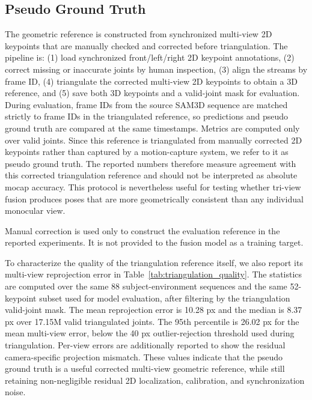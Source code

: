 \documentclass[runningheads]{llncs}
\begin{document}
\subsection{Pseudo Ground Truth}
The geometric reference is constructed from synchronized multi-view 2D keypoints that are manually checked and corrected before triangulation. The pipeline is: (1) load synchronized front/left/right 2D keypoint annotations, (2) correct missing or inaccurate joints by human inspection, (3) align the streams by frame ID, (4) triangulate the corrected multi-view 2D keypoints to obtain a 3D reference, and (5) save both 3D keypoints and a valid-joint mask for evaluation. During evaluation, frame IDs from the source SAM3D sequence are matched strictly to frame IDs in the triangulated reference, so predictions and pseudo ground truth are compared at the same timestamps. Metrics are computed only over valid joints. Since this reference is triangulated from manually corrected 2D keypoints rather than captured by a motion-capture system, we refer to it as pseudo ground truth. The reported numbers therefore measure agreement with this corrected triangulation reference and should not be interpreted as absolute mocap accuracy. This protocol is nevertheless useful for testing whether tri-view fusion produces poses that are more geometrically consistent than any individual monocular view.

Manual correction is used only to construct the evaluation reference in the reported experiments. It is not provided to the fusion model as a training target.

To characterize the quality of the triangulation reference itself, we also report its multi-view reprojection error in Table~\ref{tab:triangulation_quality}. The statistics are computed over the same 88 subject-environment sequences and the same 52-keypoint subset used for model evaluation, after filtering by the triangulation valid-joint mask. The mean reprojection error is 10.28 px and the median is 8.37 px over 17.15M valid triangulated joints. The 95th percentile is 26.02 px for the mean multi-view error, below the 40 px outlier-rejection threshold used during triangulation. Per-view errors are additionally reported to show the residual camera-specific projection mismatch. These values indicate that the pseudo ground truth is a useful corrected multi-view geometric reference, while still retaining non-negligible residual 2D localization, calibration, and synchronization noise.
\end{document}
